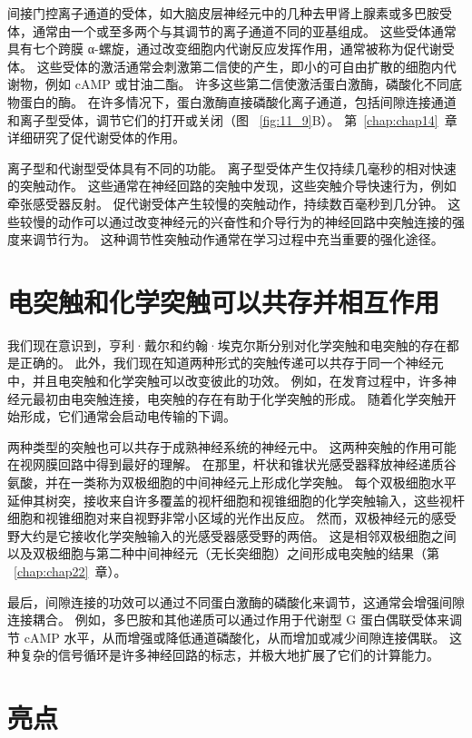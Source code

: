 间接门控离子通道的受体，如大脑皮层神经元中的几种去甲肾上腺素或多巴胺受体，通常由一个或至多两个与其调节的离子通道不同的亚基组成。
这些受体通常具有七个跨膜 α-螺旋，通过改变细胞内代谢反应发挥作用，通常被称为促代谢受体。
这些受体的激活通常会刺激第二信使的产生，即小的可自由扩散的细胞内代谢物，例如 cAMP 或甘油二酯。
许多这些第二信使激活蛋白激酶，磷酸化不同底物蛋白的酶。
在许多情况下，蛋白激酶直接磷酸化离子通道，包括间隙连接通道和离子型受体，调节它们的打开或关闭（图 ~\ref{fig:11_9}B）。 
第~\ref{chap:chap14}~章详细研究了促代谢受体的作用。


离子型和代谢型受体具有不同的功能。
离子型受体产生仅持续几毫秒的相对快速的突触动作。
这些通常在神经回路的突触中发现，这些突触介导快速行为，例如牵张感受器反射。
促代谢受体产生较慢的突触动作，持续数百毫秒到几分钟。
这些较慢的动作可以通过改变神经元的兴奋性和介导行为的神经回路中突触连接的强度来调节行为。
这种调节性突触动作通常在学习过程中充当重要的强化途径。




\section{电突触和化学突触可以共存并相互作用}

我们现在意识到，亨利·戴尔和约翰·埃克尔斯分别对化学突触和电突触的存在都是正确的。
此外，我们现在知道两种形式的突触传递可以共存于同一个神经元中，并且电突触和化学突触可以改变彼此的功效。
例如，在发育过程中，许多神经元最初由电突触连接，电突触的存在有助于化学突触的形成。
随着化学突触开始形成，它们通常会启动电传输的下调。


两种类型的突触也可以共存于成熟神经系统的神经元中。 
这两种突触的作用可能在视网膜回路中得到最好的理解。 在那里，杆状和锥状光感受器释放神经递质谷氨酸，并在一类称为双极细胞的中间神经元上形成化学突触。
每个双极细胞水平延伸其树突，接收来自许多覆盖的视杆细胞和视锥细胞的化学突触输入，这些视杆细胞和视锥细胞对来自视野非常小区域的光作出反应。
然而，双极神经元的感受野大约是它接收化学突触输入的光感受器感受野的两倍。
这是相邻双极细胞之间以及双极细胞与第二种中间神经元（无长突细胞）之间形成电突触的结果（第 ~\ref{chap:chap22}~章）。


最后，间隙连接的功效可以通过不同蛋白激酶的磷酸化来调节，这通常会增强间隙连接耦合。
例如，多巴胺和其他递质可以通过作用于代谢型 G 蛋白偶联受体来调节 cAMP 水平，从而增强或降低通道磷酸化，从而增加或减少间隙连接偶联。
这种复杂的信号循环是许多神经回路的标志，并极大地扩展了它们的计算能力。



\section{亮点}

